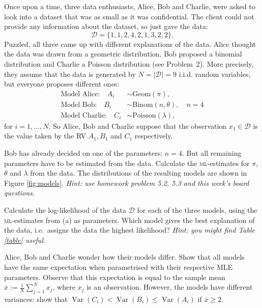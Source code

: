 \documentclass[a4paper,10pt,landscape,twocolumn]{scrartcl}
\DeclareMathOperator{\Var}{Var}
\begin{document}
\begin{exercise}
Once upon a time, three data enthusiasts, Alice, Bob and Charlie, were asked to look into a dataset that was as small as it was confidential. The client could not provide any information about the dataset, so just gave the data:
	\[
		\mathcal{D} = \{ 1, 1, 2, 4, 2, 1, 3, 2, 2 \}.
	\]
	Puzzled, all three came up with different explanations of the data. Alice thought the data was drawn from a geometric distribution, Bob proposed a binomial distribution and Charlie a Poisson distribution (see Problem~2). More precisely, they assume that the data is generated by $N = |\mathcal D|=9$ i.i.d. random variables, but everyone proposes different ones:
	\begin{align}
		\text{Model Alice:} \quad A_i &\sim \text{Geom}(\pi),\\
		\text{Model Bob:} \quad B_i &\sim \text{Binom}(n, \theta), \quad n=4\\
		\text{Model Charlie:} \quad C_i &\sim \text{Poisson}(\lambda),
	\end{align}
	for $i = 1, \dots, N$. So Alice, Bob and Charlie suppose that the observation $x_1 \in \mathcal D$ is the value taken by the RV $A_1, B_1$ and $C_1$ respectively.
	
	\begin{subex}[0.5pt]
	Bob has already decided on one of the parameters: $n=4$. But all remaining parameters have to be estimated from the data. Calculate the \textsc{ml}-estimates for $\pi$, $\theta$ and $\lambda$ from the data. The distributions of the resulting models are shown in Figure \ref{fig:models}. 
	\emph{Hint: use homework problem 5.2, 5.3 and this week's board questions}.
	\end{subex}
	
	\begin{subex}[0.5pt]
		Calculate the log-likelihood of the data $\mathcal D$ for each of the three models, using the \textsc{ml}-estimates from (a) as parameters. Which model gives the best explanation of the data, i.e.\ assigns the data the highest likelihood? \emph{Hint: you might find Table \ref{table} useful}.
	\end{subex}
	
	\begin{subex}[1pt]
		Alice, Bob and Charlie wonder how their models differ. Show that all models have the same expectation when parametrised with their respective MLE parameters. Observe that this expectation is equal to the sample mean $\overline x := \frac{1}{N} \sum_{j=1}^N x_j$, where $x_j$ is an observation. However, the models have different variances: show that $\Var(C_i) < \Var(B_i) \le \Var(A_i)$ if $\overline x \ge 2$. 	\end{subex}
	

\end{exercise}
\end{document}
